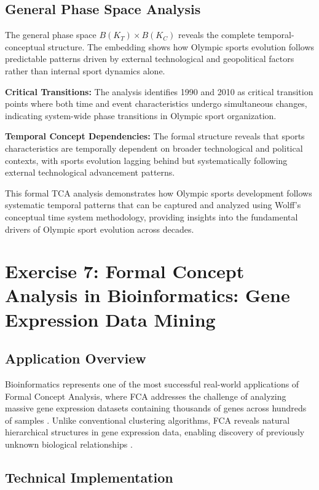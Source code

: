 \documentclass{article}
\begin{document}
\subsection*{General Phase Space Analysis}

The general phase space $B(K_T) \times B(K_C)$ reveals the complete temporal-conceptual structure. The embedding shows how Olympic sports evolution follows predictable patterns driven by external technological and geopolitical factors rather than internal sport dynamics alone.

\textbf{Critical Transitions:} The analysis identifies 1990 and 2010 as critical transition points where both time and event characteristics undergo simultaneous changes, indicating system-wide phase transitions in Olympic sport organization.

\textbf{Temporal Concept Dependencies:} The formal structure reveals that sports characteristics are temporally dependent on broader technological and political contexts, with sports evolution lagging behind but systematically following external technological advancement patterns.

This formal TCA analysis demonstrates how Olympic sports development follows systematic temporal patterns that can be captured and analyzed using Wolff's conceptual time system methodology, providing insights into the fundamental drivers of Olympic sport evolution across decades.

\newpage
\section*{Exercise 7: Formal Concept Analysis in Bioinformatics: Gene Expression Data Mining}

\subsection*{Application Overview}

Bioinformatics represents one of the most successful real-world applications of Formal Concept Analysis, where FCA addresses the challenge of analyzing massive gene expression datasets containing thousands of genes across hundreds of samples \cite{kuznetsov2013knowledge}. Unlike conventional clustering algorithms, FCA reveals natural hierarchical structures in gene expression data, enabling discovery of previously unknown biological relationships \cite{pensa2014mining}.

\subsection*{Technical Implementation}
\end{document}
